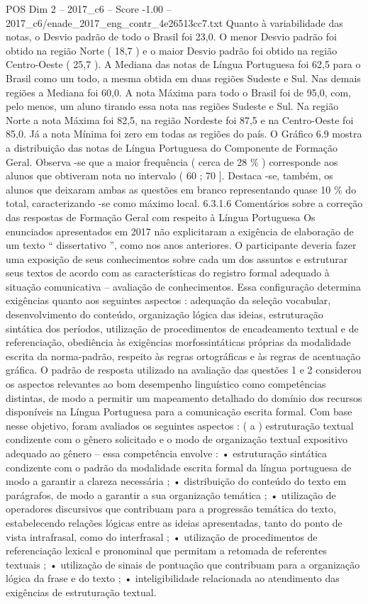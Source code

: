 \begin{textsample}{POS Dim 2 – 2017\_c6 – Score -1.00 – 2017\_c6/enade\_2017\_eng\_contr\_4e26513cc7.txt}
Quanto à variabilidade das notas, o Desvio padrão de todo o Brasil foi 23,0.
O menor Desvio padrão foi obtido na região Norte ( 18,7 ) e o maior Desvio padrão foi obtido na região Centro-Oeste ( 25,7 ).
A Mediana das notas de Língua Portuguesa foi 62,5 para o Brasil como um todo, a mesma obtida em duas regiões Sudeste e Sul.
Nas demais regiões a Mediana foi 60,0.
A nota Máxima para todo o Brasil foi de 95,0, com, pelo menos, um aluno tirando essa nota nas regiões Sudeste e Sul.
Na região Norte a nota Máxima foi 82,5, na região Nordeste foi 87,5 e na Centro-Oeste foi 85,0.
Já a nota Mínima foi zero em todas as regiões do país.
O Gráfico 6.9 mostra a distribuição das notas de Língua Portuguesa do Componente de Formação Geral.
Observa -se que a maior frequência ( cerca de 28 \% ) corresponde aos alunos que obtiveram nota no intervalo ( 60 ; 70 ].
Destaca -se, também, os alunos que deixaram ambas as questões em branco representando quase 10 \% do total, caracterizando -se como máximo local. 6.3.1.6 Comentários sobre a correção das respostas de Formação Geral com respeito à Língua Portuguesa Os enunciados apresentados em 2017 não explicitaram a exigência de elaboração de um texto “ dissertativo ”, como nos anos anteriores.
O participante deveria fazer uma exposição de seus conhecimentos sobre cada um dos assuntos e estruturar seus textos de acordo com as características do registro formal adequado à situação comunicativa – avaliação de conhecimentos.
Essa configuração determina exigências quanto aos seguintes aspectos : adequação da seleção vocabular, desenvolvimento do conteúdo, organização lógica das ideias, estruturação sintática dos períodos, utilização de procedimentos de encadeamento textual e de referenciação, obediência às exigências morfossintáticas próprias da modalidade escrita da norma-padrão, respeito às regras ortográficas e às regras de acentuação gráfica.
O padrão de resposta utilizado na avaliação das questões 1 e 2 considerou os aspectos relevantes ao bom desempenho linguístico como competências distintas, de modo a permitir um mapeamento detalhado do domínio dos recursos disponíveis na Língua Portuguesa para a comunicação escrita formal.
Com base nesse objetivo, foram avaliados os seguintes aspectos : ( a ) estruturação textual condizente com o gênero solicitado e o modo de organização textual expositivo adequado ao gênero – essa competência envolve : • estruturação sintática condizente com o padrão da modalidade escrita formal da língua portuguesa de modo a garantir a clareza necessária ; • distribuição do conteúdo do texto em parágrafos, de modo a garantir a sua organização temática ; • utilização de operadores discursivos que contribuam para a progressão temática do texto, estabelecendo relações lógicas entre as ideias apresentadas, tanto do ponto de vista intrafrasal, como do interfrasal ; • utilização de procedimentos de referenciação lexical e pronominal que permitam a retomada de referentes textuais ; • utilização de sinais de pontuação que contribuam para a organização lógica da frase e do texto ; • inteligibilidade relacionada ao atendimento das exigências de estruturação textual.

\end{textsample}
